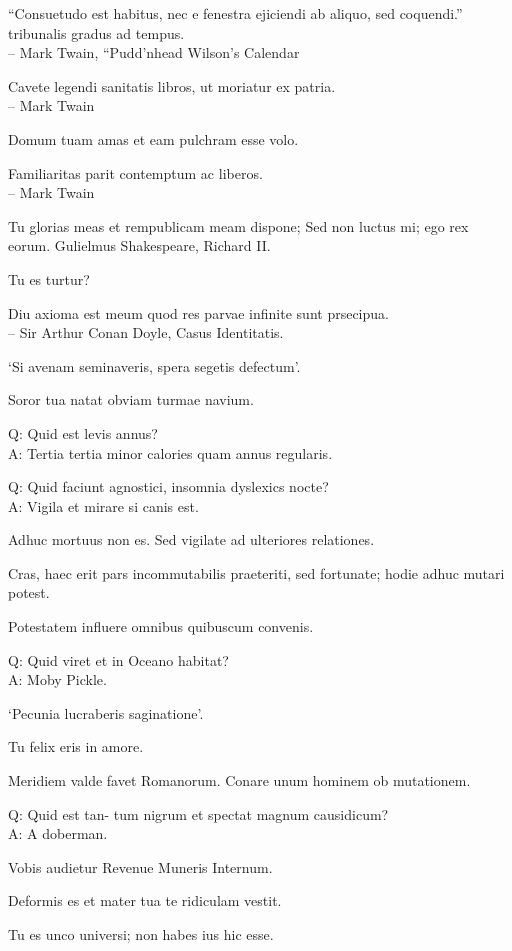 \documentclass[titlepage,12pt]{memoir}
\begin{document}
“Consuetudo est habitus, nec e fenestra ejiciendi ab aliquo, sed coquendi.”
tribunalis gradus ad tempus.
\\-- Mark Twain, “Pudd’nhead Wilson’s Calendar

Cavete legendi sanitatis libros, ut moriatur ex patria.
\\-- Mark Twain

Domum tuam amas et eam pulchram esse volo.

 Familiaritas parit contemptum ac liberos.
\\-- Mark Twain

Tu glorias meas et rempublicam meam dispone;
Sed non luctus mi; ego rex eorum.
Gulielmus Shakespeare, Richard II.

Tu es turtur?

Diu axioma est meum quod res parvae infinite sunt
prsecipua.
\\-- Sir Arthur Conan Doyle, Casus Identitatis.

‘Si avenam seminaveris, spera segetis defectum’.

Soror tua natat obviam turmae navium.

Q: Quid est levis annus?\\
A: Tertia tertia minor calories quam annus regularis.

Q: Quid faciunt agnostici, insomnia dyslexics nocte?\\
A: Vigila et mirare si canis est.

Adhuc mortuus non es. Sed vigilate ad ulteriores relationes.

Cras, haec erit pars incommutabilis praeteriti, sed fortunate;
hodie adhuc mutari potest.

Potestatem influere omnibus quibuscum convenis.

Q: Quid viret et in Oceano habitat?\\
A: Moby Pickle.

‘Pecunia lucraberis saginatione’.

Tu felix eris in amore.

Meridiem valde favet Romanorum. Conare unum hominem ob mutationem.

Q: Quid est tan- tum nigrum et spectat magnum causidicum?\\
A: A doberman.

Vobis audietur Revenue Muneris Internum.

Deformis es et mater tua te ridiculam vestit.

Tu es unco universi; non habes ius hic esse.
\end{document}

